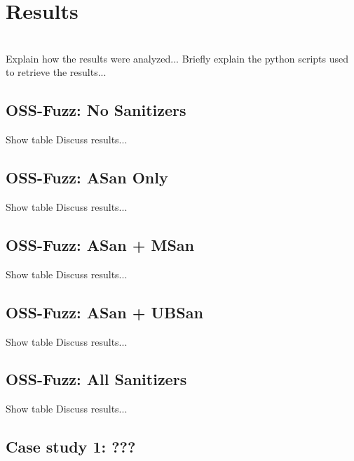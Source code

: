 \chapter{Results}
\ \\
Explain how the results were analyzed...
\newline \newline
Briefly explain the python scripts used to retrieve the results...



\newpage
\section{OSS-Fuzz: No Sanitizers}
Show table
\newline \newline
Discuss results...

\newpage
\section{OSS-Fuzz: ASan Only}
Show table
\newline \newline
Discuss results...

\newpage
\section{OSS-Fuzz: ASan + MSan}
Show table
\newline \newline
Discuss results...

\newpage
\section{OSS-Fuzz: ASan + UBSan}
Show table
\newline \newline
Discuss results...

\newpage
\section{OSS-Fuzz: All Sanitizers}
Show table
\newline \newline
Discuss results...

\newpage
\section{Case study 1: ???}


